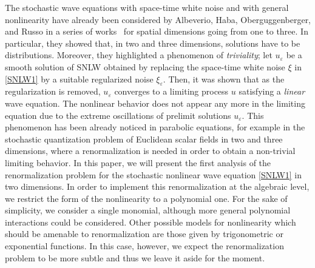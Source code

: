 \documentclass[letterpaper, 11pt,  reqno]{amsart}
\newcommand{\1}{\hspace{0.5mm}\text{I}\hspace{0.5mm}}
\newcommand{\noi}{\noindent}
\newcommand{\eps}{\varepsilon}
\numberwithin{equation}{section}
\numberwithin{theorem}{section}
\newcommand{\hiro}[1]{\marginpar{\color{red} $\Leftarrow\Leftarrow\Leftarrow$}{\smallskip \noi\color{blue}HIRO: #1}\smallskip}
\begin{document}
The stochastic wave equations with space-time white noise and with general nonlinearity 
have already been considered by Albeverio, Haba, Oberguggenberger, and Russo in a series of works~\cite{russo1,russo2,russo3,russo4} 
for spatial dimensions going from one to three. 
In particular, they showed that, in two and three dimensions, solutions have to be distributions.
Moreover, they highlighted a phenomenon of \emph{triviality};
let $u_\eps$ be a smooth solution of SNLW obtained by replacing the space-time white noise $\xi$
in \eqref{SNLW1}
by a suitable regularized noise  $\xi_\eps$.
Then, it was shown that as the regularization is removed,
$u_\eps$ converges  to a limiting process $u$
satisfying  a \emph{linear} wave equation. 
%
%
%
%
%
The nonlinear behavior does not appear any more in the limiting equation due to the extreme oscillations of prelimit solutions $u_\eps$. This phenomenon has been already noticed in parabolic equations, for example in the stochastic quantization problem of Euclidean scalar fields in two and three 
dimensions,
where 
 a renormalization is needed in order to obtain a non-trivial limiting behavior. 
 In this paper,  we will present the first analysis of the renormalization problem for the stochastic nonlinear wave equation \eqref{SNLW1} in two dimensions. 
 In order to  implement this renormalization at the algebraic level,
  we restrict   the form of the nonlinearity to a polynomial one. For the sake of simplicity, we consider a single monomial,  although 
 more general polynomial interactions could be considered. Other possible models for nonlinearity which should be amenable to renormalization are those given by trigonometric or exponential functions.
 In this case, however,  we expect the renormalization problem to be more subtle and 
 thus we leave it aside for the moment.


%
\end{document}
